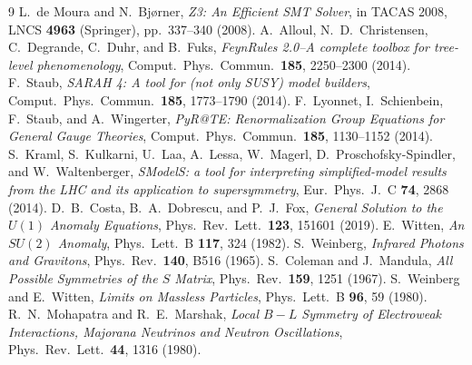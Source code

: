 \documentclass[11pt]{article}
\begin{document}
\begin{thebibliography}{9}
\small
{} L.~de Moura and N.~Bj{\o}rner, \emph{Z3: An Efficient SMT Solver},
in TACAS 2008, LNCS \textbf{4963} (Springer), pp.~337--340 (2008).
 A.~Alloul, N.~D.~Christensen, C.~Degrande, C.~Duhr, and
B.~Fuks, \emph{FeynRules 2.0--A complete toolbox for tree-level
phenomenology}, Comput.\ Phys.\ Commun.\ \textbf{185}, 2250--2300 (2014).
 F.~Staub, \emph{SARAH 4: A tool for (not only SUSY) model
builders}, Comput.\ Phys.\ Commun.\ \textbf{185}, 1773--1790 (2014).
 F.~Lyonnet, I.~Schienbein, F.~Staub, and A.~Wingerter,
\emph{PyR@TE: Renormalization Group Equations for General Gauge Theories},
Comput.\ Phys.\ Commun.\ \textbf{185}, 1130--1152 (2014).
 S.~Kraml, S.~Kulkarni, U.~Laa, A.~Lessa, W.~Magerl,
D.~Proschofsky-Spindler, and W.~Waltenberger, \emph{SModelS: a tool for
interpreting simplified-model results from the LHC and its application to
supersymmetry}, Eur.\ Phys.\ J.\ C \textbf{74}, 2868 (2014).
 D.~B.~Costa, B.~A.~Dobrescu, and P.~J.~Fox,
\emph{General Solution to the $U(1)$ Anomaly Equations}, Phys.\ Rev.\ Lett.\
\textbf{123}, 151601 (2019).
 E.~Witten, \emph{An $SU(2)$ Anomaly}, Phys.\ Lett.\ B
\textbf{117}, 324 (1982).
 S.~Weinberg, \emph{Infrared Photons and Gravitons},
Phys.\ Rev.\ \textbf{140}, B516 (1965).
 S.~Coleman and J.~Mandula, \emph{All Possible
Symmetries of the $S$ Matrix}, Phys.\ Rev.\ \textbf{159}, 1251 (1967).
\bibitem{weinbergwitten} S.~Weinberg and E.~Witten, \emph{Limits on Massless
Particles}, Phys.\ Lett.\ B \textbf{96}, 59 (1980).
 R.~N.~Mohapatra and R.~E.~Marshak, \emph{Local $B\!-\!L$
Symmetry of Electroweak Interactions, Majorana Neutrinos and Neutron
Oscillations}, Phys.\ Rev.\ Lett.\ \textbf{44}, 1316 (1980).
\end{thebibliography}
\end{document}
